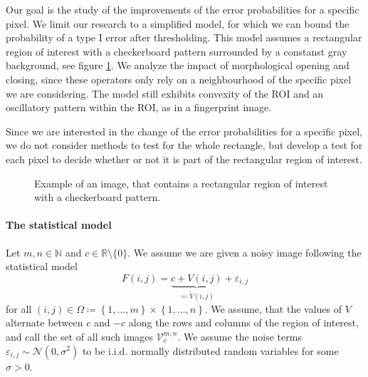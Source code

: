 \documentclass[a4paper,12pt]{article}
\theoremstyle{plain}
\theoremstyle{definition}
\begin{document}
Our goal is the study of the improvements of the error probabilities for a specific pixel. We limit our research to a simplified model, for which we can bound the probability of a type I error after thresholding. This model assumes a rectangular region of interest with a checkerboard pattern surrounded by a constanst gray background, see figure \ref{fig: exampleV}. We analyze the impact of morphological opening and closing, since these operators only rely on a neighbourhood of the specific pixel we are considering. The model still exhibits convexity of the ROI and an oscillatory pattern within the ROI, as in a fingerprint image.

Since we are interested in the change of the error probabilities for a specific pixel, we do not consider methods to test for the whole rectangle, but develop a test for each pixel to decide whether or not it is part of the rectangular region of interest.

\begin{figure}[h]
	\centering
	\caption{Example of an image, that contains a rectangular region of interest with a checkerboard pattern.}
	\label{fig: exampleV}
\end{figure}

\paragraph{The statistical model}

Let $m, n \in \mathbb{N}$ and $c \in \mathbb{R} \setminus \{ 0 \}$. We assume we are given a noisy image following the statistical model
\begin{equation}\label{statmodel}
	F(i, j) = \underbrace{c + V(i, j)}_{\eqqcolon \tilde{V}(i, j)} + \varepsilon_{i, j}
\end{equation}
for all $(i, j) \in \Omega \coloneqq \left\{ 1, \dots, m \right\} \times \left\{ 1, \dots, n \right\}$. We assume, that the values of $V$ alternate between $c$ and $-c$ along the rows and columns of the region of interest, and call the set of all such images $\mathcal{V}_c^{m, n}$. We assume the noise terms $\varepsilon_{i, j} \sim \mathcal{N}(0, \sigma^2)$ to be i.i.d. normally distributed random variables for some $\sigma > 0$.
\end{document}
